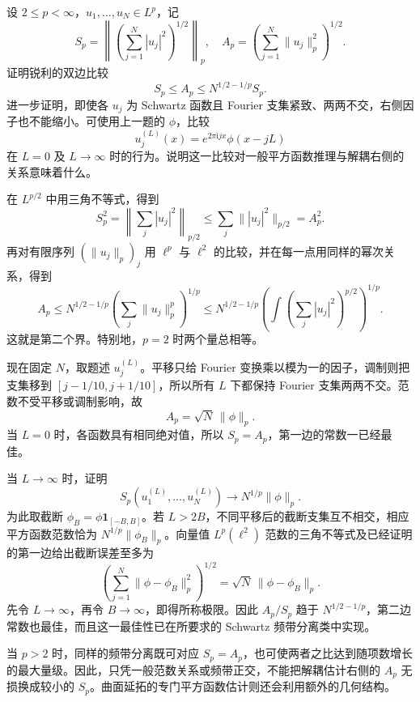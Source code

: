 \begin{optionalexercise}\label{b2:ex:25-new-8}
设 \(2\leq p<\infty\)，\(u_1,\ldots,u_N\in L^p\)，记
\[
 S_p=\left\|\left(\sum_{j=1}^N|u_j|^2\right)^{1/2}\right\|_p,
 \quad A_p=\left(\sum_{j=1}^N\|u_j\|_p^2\right)^{1/2}.
\]
证明锐利的双边比较
\[
 S_p\leq A_p\leq N^{1/2-1/p}S_p.
\]
进一步证明，即使各 \(u_j\) 为 Schwartz 函数且 Fourier 支集紧致、两两不交，右侧因子也不能缩小。可使用上一题的 \(\phi\)，比较
\[
 u_j^{(L)}(x)=e^{2\pi\mathrm i jx}\phi(x-jL)
\]
在 \(L=0\) 及 \(L\to\infty\) 时的行为。说明这一比较对一般平方函数推理与解耦右侧的关系意味着什么。
\end{optionalexercise}
\begin{solution}
在 \(L^{p/2}\) 中用三角不等式，得到
\[
 S_p^2
 =\left\|\sum_j|u_j|^2\right\|_{p/2}
 \leq\sum_j\||u_j|^2\|_{p/2}=A_p^2.
\]
再对有限序列 \((\|u_j\|_p)_j\) 用 \(\ell^p\) 与 \(\ell^2\) 的比较，并在每一点用同样的幂次关系，得到
\[
 A_p
 \leq N^{1/2-1/p}\left(\sum_j\|u_j\|_p^p\right)^{1/p}
 \leq N^{1/2-1/p}
       \left(\int\left(\sum_j|u_j|^2\right)^{p/2}\right)^{1/p}.
\]
这就是第二个界。特别地，\(p=2\) 时两个量总相等。

现在固定 \(N\)，取题述 \(u_j^{(L)}\)。平移只给 Fourier 变换乘以模为一的因子，调制则把支集移到
\([j-1/10,j+1/10]\)，所以所有 \(L\) 下都保持 Fourier 支集两两不交。范数不受平移或调制影响，故
\[
 A_p=\sqrt N\,\|\phi\|_p.
\]
当 \(L=0\) 时，各函数具有相同绝对值，所以 \(S_p=A_p\)，第一边的常数一已经最佳。

当 \(L\to\infty\) 时，证明
\[
 S_p(u_1^{(L)},\ldots,u_N^{(L)})
       \longrightarrow N^{1/p}\|\phi\|_p.
\]
为此取截断 \(\phi_B=\phi\mathbf1_{[-B,B]}\)。若 \(L>2B\)，不同平移后的截断支集互不相交，相应平方函数范数恰为
\(N^{1/p}\|\phi_B\|_p\)。向量值 \(L^p(\ell^2)\) 范数的三角不等式及已经证明的第一边给出截断误差至多为
\[
 \left(\sum_{j=1}^N\|\phi-\phi_B\|_p^2\right)^{1/2}
       =\sqrt N\,\|\phi-\phi_B\|_p.
\]
先令 \(L\to\infty\)，再令 \(B\to\infty\)，即得所称极限。因此 \(A_p/S_p\) 趋于
\(N^{1/2-1/p}\)，第二边常数也最佳，而且这一最佳性已在所要求的 Schwartz 频带分离类中实现。

当 \(p>2\) 时，同样的频带分离既可对应 \(S_p=A_p\)，也可使两者之比达到随项数增长的最大量级。因此，只凭一般范数关系或频带正交，不能把解耦估计右侧的 \(A_p\) 无损换成较小的 \(S_p\)。曲面延拓的专门平方函数估计则还会利用额外的几何结构。
\end{solution}
